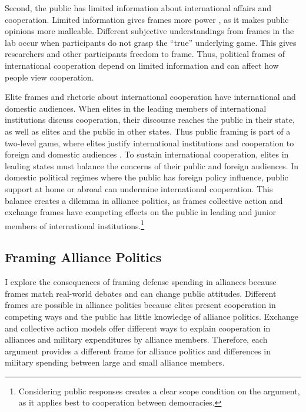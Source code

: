 \documentclass[12pt]{article}
\begin{document}
Second, the public has limited information about international affairs and cooperation.
Limited information gives frames more power \citep{Druckman2001}, as it makes public opinions more malleable. 
Different subjective understandings from frames in the lab occur when participants do not grasp the ``true'' underlying game. 
This gives researchers and other participants freedom to frame.
Thus, political frames of international cooperation depend on limited information and can affect how people view cooperation.  


Elite frames and rhetoric about international cooperation have international and domestic audiences. 
When elites in the leading members of international institutions discuss cooperation, their discourse reaches the public in their state, as well as elites and the public in other states. 
Thus public framing is part of a two-level game, where elites justify international institutions and cooperation to foreign and domestic audiences \citep{Putnam1988}.
To sustain international cooperation, elites in leading states must balance the concerns of their public and foreign audiences. 
In domestic political regimes where the public has foreign policy influence, public support at home or abroad can undermine international cooperation. 
This balance creates a dilemma in alliance politics, as frames collective action and exchange frames have competing effects on the public in leading and junior members of international institutions.\footnote{Considering public responses creates a clear scope condition on the argument, as it applies best to cooperation between democracies.}


\subsection{Framing Alliance Politics}


I explore the consequences of framing defense spending in alliances because frames match real-world debates and can change public attitudes.  
Different frames are possible in alliance politics because elites present cooperation in competing ways and the public has little knowledge of alliance politics. 
Exchange and collective action models offer different ways to explain cooperation in alliances and military expenditures by alliance members.
Therefore, each argument provides a different frame for alliance politics and differences in military spending between large and small alliance members. 
\end{document}
